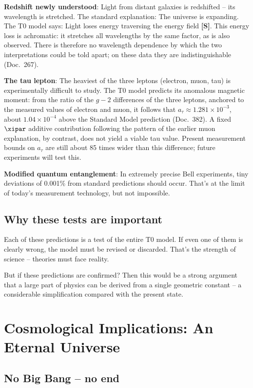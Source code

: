 	\textbf{Redshift newly understood}: Light from distant galaxies is redshifted -- its wavelength is stretched. The standard explanation: The universe is expanding. The T0 model says: Light loses energy traversing the energy field \textbf{[S]}. This energy loss is achromatic: it stretches all wavelengths by the same factor, as is also observed. There is therefore no wavelength dependence by which the two interpretations could be told apart; on these data they are indistinguishable (Doc.~267).
	
	\textbf{The tau lepton}: The heaviest of the three leptons (electron, muon, tau) is experimentally difficult to study. The T0 model predicts its anomalous magnetic moment: from the ratio of the $g-2$ differences of the three leptons, anchored to the measured values of electron and muon, it follows that $a_\tau \approx 1.281 \times 10^{-3}$, about $1.04\times10^{-4}$ above the Standard Model prediction (Doc.~382). A fixed $\xipar$ additive contribution following the pattern of the earlier muon explanation, by contrast, does not yield a viable tau value. Present measurement bounds on $a_\tau$ are still about 85 times wider than this difference; future experiments will test this.
	
	\textbf{Modified quantum entanglement}: In extremely precise Bell experiments, tiny deviations of 0.001\% from standard predictions should occur. That's at the limit of today's measurement technology, but not impossible.
	
	\subsection{Why these tests are important}
	
	Each of these predictions is a test of the entire T0 model. If even one of them is clearly wrong, the model must be revised or discarded. That's the strength of science -- theories must face reality.
	
	But if these predictions are confirmed? Then this would be a strong argument that a large part of physics can be derived from a single geometric constant -- a considerable simplification compared with the present state.
	
	\section{Cosmological Implications: An Eternal Universe}
	
	\subsection{No Big Bang -- no end}
	
